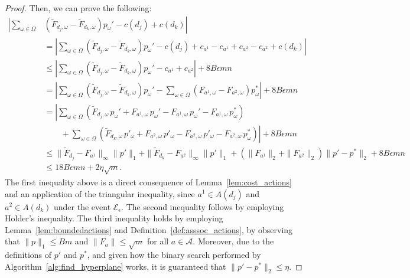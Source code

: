 \begin{proof}
	Then, we can prove the following:
	\begin{align*}
	\left| \sum_{\omega \in \Omega} \right.& \left. \left(  \widetilde{F}_{d_{j},\omega} -  \widetilde{F}_{d_{k},\omega} \right) p_{\omega}'    - c(d_j) + c(d_k) \right|  \\
	&= \left|  \sum_{\omega \in \Omega}  \left(  \widetilde{F}_{d_{j},\omega} -  \widetilde{F}_{d_{k},\omega} \right) p_{\omega}' - {c}(d_j) + {c}_{a^1} - {c}_{a^1} + {c}_{a^2} - {c}_{a^2} + {c}(d_k)  \right| \\
	& \le \left | \sum_{\omega \in \Omega}  \left(  \widetilde{F}_{d_{j},\omega} -  \widetilde{F}_{d_{k},\omega} \right) p_{\omega}'  - {c}_{a^1} + {c}_{a^2}  \right| + 8B \epsilon m n  \\
	& = \left| \sum_{\omega \in \Omega}  \left(  \widetilde{F}_{d_{j},\omega} -  \widetilde{F}_{d_{k},\omega} \right) p_{\omega}' - \sum_{\omega \in \Omega} \left(  F_{a^1,\omega} - F_{a^2,\omega}  \right) p^*_\omega  \right| + 8B \epsilon m n \\
	& = \left| \sum_{\omega \in \Omega} \left( \widetilde{F}_{d_{j},\omega} \, p_\omega'  + {F}_{a^1,\omega} \, p_\omega' - {F}_{a^1,\omega} \, p_\omega' - {F}_{a^1,\omega} \, p^*_\omega  \right) \right. \\
	& \left. \quad\quad + \sum_{\omega \in \Omega} \left(\widetilde{F}_{d_{k},\omega} \, p'_\omega + {F}_{a^2,\omega} \, p'_\omega  - {F}_{a^2,\omega} \, p'_\omega - 
	{F}_{a^2,\omega} \, p^*_\omega \right) \right| + 8B \epsilon m n \\
	& \le \| \widetilde{F}_{d_{j}} - {F}_{a^1} \|_{\infty} \| p'\|_{1} +  \| \widetilde{F}_{d_{k}} - {F}_{a^2} \|_{\infty} \| p'\|_{1} %
	+ \left( \| {F}_{a^1} \|_{2} + \| F_{a^2}\|_{2} \right) \| p'-p^* \|_{2} + 8B \epsilon m n  \\
	& \le  18 B \epsilon m n + 2 \eta \sqrt{m}.
	\end{align*}
	The first inequality above is a direct consequence of Lemma~\ref{lem:cost_actions} and an application of the triangular inequality, since $a^1 \in A(d_j)$ and $a^2 \in A(d_k)$ under the event $\mathcal{E}_\epsilon$.
	The second inequality follows by employing Holder's inequality. The third inequality holds by employing Lemma~\ref{lem:boundedactions} and Definition~\ref{def:asssoc_actions}, by observing that $\|p\|_1 \le Bm$ and $\| F_a \| \le \sqrt{m}$ for all $a \in \mathcal{A}$. Moreover, due to the definitions of $p'$ and $p^*$, and given how the binary search performed by Algorithm~\ref{alg:find_hyperplane} works, it is guaranteed that $\| p' - p^* \|_2 \le \eta$.
	

\end{proof}
